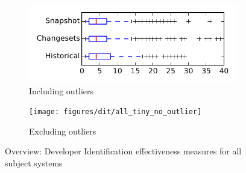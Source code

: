 
\begin{figure}
    \centering
    \begin{subfigure}{.4\textwidth}
        \centering
        \includegraphics[height=0.4\textheight]{figures/dit/all_tiny}
        \caption{Including outliers}\label{fig:dit:all:tiny_outlier}
    \end{subfigure}%
    \begin{subfigure}{.4\textwidth}
        \centering
        \texttt{[image: figures/dit/all\_tiny\_no\_outlier]}
        \caption{Excluding outliers}\label{fig:dit:all:tiny_no_outlier}
    \end{subfigure}
\caption{Overview: Developer Identification effectiveness measures for all subject systems}
\label{fig:dit:all:tiny}
\end{figure}
